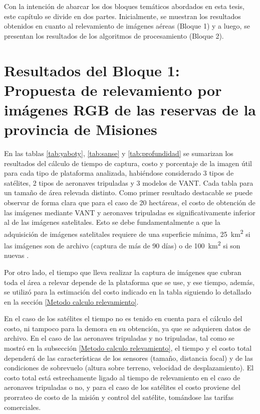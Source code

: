 

\color{black} 
Con la intención de abarcar los dos bloques temáticos abordados en esta tesis, este capítulo se divide en dos partes. Inicialmente, se muestran los resultados obtenidos en cuanto al relevamiento de imágenes aéreas (Bloque 1) y a luego, se presentan los resultados de los algoritmos de procesamiento (Bloque 2).
\section {Resultados del Bloque 1: Propuesta de relevamiento por imágenes RGB de las reservas de la provincia de Misiones} \label{resultados bloque 1}


En las tablas \ref{tab:yaboty}, \ref{tab:sanse} y \ref{tab:profundidad} se sumarizan los resultados del cálculo de tiempo de captura, costo y porcentaje de la imagen útil para cada tipo de plataforma analizada, habiéndose considerado 3 tipos de satélites, 2 tipos de aeronaves tripuladas y 3 modelos de VANT. Cada tabla para un tamaño de área relevada distinto. Como primer resultado destacable se puede observar de forma clara que para el caso de 20 hectáreas, el costo de obtención de las imágenes mediante VANT y aeronaves tripuladas es significativamente inferior al de las imágenes satelitales. Esto se debe fundamentalmente a que la adquisición de imágenes satelitales requiere de una superficie mínima, \SI{25}{\kilo\metre\squared} si las imágenes son de archivo (captura de más de 90 días) o de \SI{100}{\kilo\metre\squared} si son nuevas \cite{noauthor_satellite_2020}.

Por otro lado, el tiempo que lleva realizar la captura de imágenes que cubran toda el área a relevar depende de la plataforma que se use, y ese tiempo, además, se utilizó para la estimación del costo indicado en la tabla siguiendo lo detallado en la sección \ref{Metodo calculo relevamiento}. 

En el caso de los satélites el tiempo no es tenido en cuenta para el cálculo del costo, ni tampoco para la demora en su obtención, ya que se adquieren datos de archivo. En el caso de las aeronaves tripuladas y no tripuladas, tal como se mostró en la subsección \ref{Metodo calculo relevamiento}, el tiempo y el costo total dependerá de las características de los sensores (tamaño, distancia focal) y de las condiciones de sobrevuelo (altura sobre terreno, velocidad de desplazamiento). El costo total está estrechamente ligado al tiempo de relevamiento en el caso de aeronaves tripuladas o no, y para el caso de los satélites el costo proviene del prorrateo de costo de la misión y control del satélite, tomándose las tarifas comerciales.

